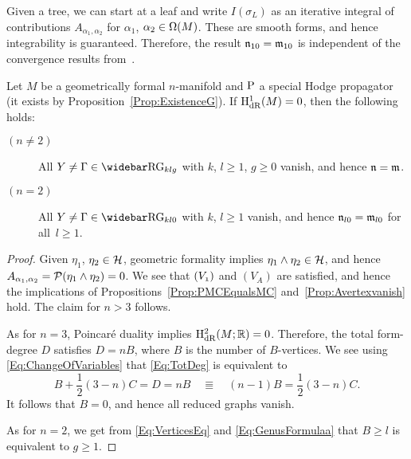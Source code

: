 \documentclass[\MainFolder/Text.tex]{subfiles}
\begin{document}
\begin{Remark}
Given a tree, we can start at a leaf and write $I(\sigma_L)$ as an iterative integral of contributions $A_{\alpha_1,\alpha_2}$ for $\alpha_1$, $\alpha_2 \in \Omega(M)$. These are smooth forms, and hence integrability is guaranteed. Therefore, the result $\mathfrak{n}_{10} = \mathfrak{m}_{10}$ is independent of the convergence results from~\cite{Cieliebak2018}.
\end{Remark}

\begin{Proposition} \label{Prop:GeomForm}
Let $M$ be a geometrically formal $n$-manifold and $\mathrm{P}$ a special Hodge propagator (it exists by Proposition~\ref{Prop:ExistenceG}). If $\mathrm{H}_{\mathrm{dR}}^1(M) = 0$, then the following holds:
\begin{description}
\item[$(n\neq 2)$]  All $Y \neq \Gamma \in \RRG_{klg}$ with $k$, $l\ge 1$, $g\ge 0$ vanish, and hence $\mathfrak{n} = \mathfrak{m}$.
\item[$(n=2)$] All $Y\neq \Gamma \in \RRG_{kl0}$ with $k$, $l\ge 1$ vanish, and hence $\mathfrak{n}_{l0} = \mathfrak{m}_{l0}$ for all~$l\ge 1$.
\end{description}
\end{Proposition}
\begin{proof}
Given $\eta_1$, $\eta_2 \in \mathcal{H}$, geometric formality implies $\eta_1 \wedge \eta_2 \in \mathcal{H}$, and hence $A_{\alpha_1,\alpha_2} = \mathcal{P}(\eta_1\wedge\eta_2) = 0$. We see that $(V_{\NOne})$ and $(V_{A})$ are satisfied, and hence the implications of Propositions~\ref{Prop:PMCEqualsMC} and~\ref{Prop:Avertexvanish} hold. The claim for $n>3$ follows.

As for $n=3$, Poincar\'e duality implies $\mathrm{H}_{\mathrm{dR}}^2(M;\mathbb{R})=0$. Therefore, the total form-degree $D$ satisfies $D= n B$, where $B$ is the number of $B$-vertices. We see using \eqref{Eq:ChangeOfVariables} that \eqref{Eq:TotDeg} is equivalent to
\begin{equation}\label{Eq:VerticesEq}
B+\frac{1}{2}(3-n) C = D = nB\quad\Equiv\quad (n-1)B = \frac{1}{2}(3-n) C.
\end{equation}
It follows that $B=0$, and hence all reduced graphs vanish.

As for $n=2$, we get from \eqref{Eq:VerticesEq} and \eqref{Eq:GenusFormulaa} that $B\ge l$ is equivalent to $g\ge 1$.
\qedhere
\end{proof}
\end{document}
